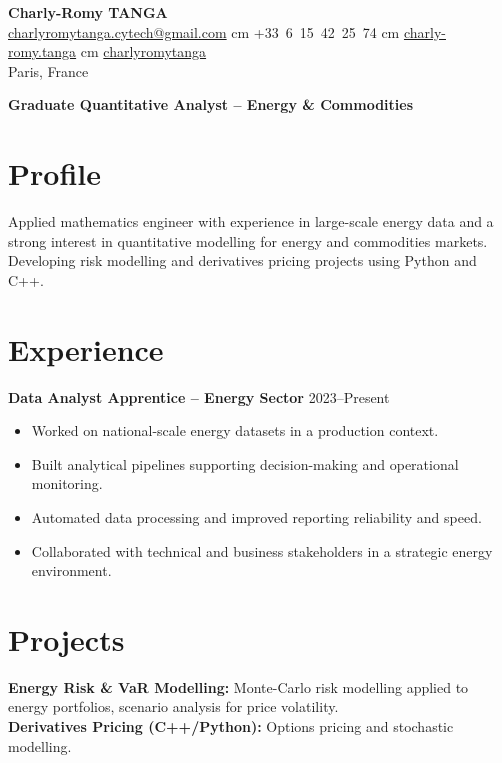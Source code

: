 \documentclass[10pt, letterpaper]{article}
\begin{document}
\begin{center}
    \textbf{\LARGE Charly-Romy TANGA} \\[0.15cm]
    \mbox{\href{mailto:charlyromytanga.cytech@gmail.com}{\footnotesize\faEnvelope\hspace*{0.1cm}charlyromytanga.cytech@gmail.com}}
     cm
    \mbox{\faPhone\hspace*{0.1cm}+33 6 15 42 25 74}
     cm
    \mbox{\href{https://www.linkedin.com/in/charly-romy-tanga}{\footnotesize\faLinkedin\hspace*{0.1cm}charly-romy.tanga}}
     cm
    \mbox{\href{https://github.com/charlyromytanga}{\footnotesize\faGithub\hspace*{0.1cm}charlyromytanga}}
    \\[0.15cm]
    Paris, France
\end{center}

\textbf{Graduate Quantitative Analyst -- Energy \& Commodities}

\section*{Profile}
Applied mathematics engineer with experience in large-scale energy data and a strong interest in quantitative modelling for energy and commodities markets. Developing risk modelling and derivatives pricing projects using Python and C++.

\section*{Experience}
\textbf{Data Analyst Apprentice -- Energy Sector} \hfill 2023--Present
\begin{itemize}[leftmargin=0.45cm,itemsep=1pt,topsep=2pt]
\item Worked on national-scale energy datasets in a production context.
\item Built analytical pipelines supporting decision-making and operational monitoring.
\item Automated data processing and improved reporting reliability and speed.
\item Collaborated with technical and business stakeholders in a strategic energy environment.
\end{itemize}

\section*{Projects}
\textbf{Energy Risk \& VaR Modelling:} Monte-Carlo risk modelling applied to energy portfolios, scenario analysis for price volatility.\\
\textbf{Derivatives Pricing (C++/Python):} Options pricing and stochastic modelling.
\end{document}
